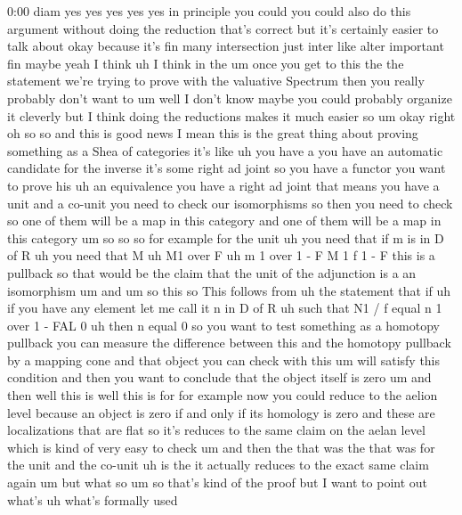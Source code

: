 \begin{unfinished}{0:00}
diam  yes  yes  yes  yes  yes  in  principle
you  could  you  could  also  do  this
argument  without  doing  the  reduction
that's  correct  but  it's  certainly  easier
to  talk
about  okay  because  it's  fin  many
intersection  just
inter  like
alter  important  fin  maybe  yeah  I  think
uh  I  think  in  the  um  once  you  get  to
this  the  the  statement  we're  trying  to
prove  with  the  valuative  Spectrum  then
you  really  probably  don't  want  to  um
well  I  don't  know  maybe  you  could
probably  organize  it  cleverly  but  I
think  doing  the  reductions  makes  it  much
easier  so
um  okay  right  oh  so  so  and  this  is  good
news  I  mean  this  is  the  great  thing
about  proving  something  as  a  Shea  of
categories  it's  like  uh  you  have  a  you
have  an  automatic  candidate  for  the
inverse  it's  some  right  ad  joint  so  you
have  a  functor  you  want  to  prove
his  uh  an  equivalence  you  have  a  right
ad  joint  that  means  you  have  a  unit  and
a  co-unit  you  need  to  check  our
isomorphisms  so  then  you  need  to
check  so  one  of  them  will  be  a  map  in
this  category  and  one  of  them  will  be  a
map  in  this
category
um
so  so  so  for  example  for  the  unit  uh  you
need  that  if  m  is  in  D  of
R  uh  you  need  that  M  uh  M1  over  F  uh  m  1
over  1  -  F  M  1  f  1  -  F  this  is  a
pullback  so  that  would  be  the  claim  that
the  unit  of  the  adjunction  is  a  an
isomorphism
um  and
um  so
this  so  This  follows
from  uh  the  statement  that  if  uh  if  you
have  any  element  let  me  call  it  n  in  D
of  R  uh  such  that  N1  /  f  equal  n  1  over
1  -  FAL  0  uh  then  n  equal
0  so  you  want  to  test  something  as  a
homotopy  pullback  you  can  measure  the
difference  between  this  and  the  homotopy
pullback  by  a  mapping  cone  and  that
object  you  can  check  with  this  um  will
satisfy  this  condition  and  then  you  want
to  conclude  that  the  object  itself  is
zero  um  and  then  well  this
is  well  this  is  for  for  example  now  you
could  reduce  to  the  aelion  level  because
an  object  is  zero  if  and  only  if  its
homology  is  zero  and  these  are
localizations  that  are  flat
so  it's  reduces  to  the  same  claim  on  the
aelan  level  which  is  kind  of  very  easy
to  check
um  and  then  the  that  was  the  that  was
for  the  unit  and  the  co-unit  uh  is
the  it  actually  reduces  to  the  exact
same  claim  again  um  but  what  so  um  so
that's  kind  of  the  proof  but  I  want  to
point  out  what's  uh  what's  formally  used

\end{unfinished}
